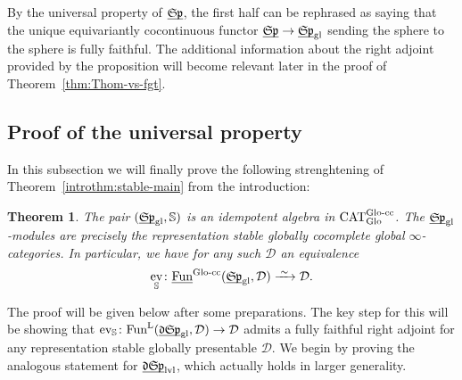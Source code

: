 \documentclass[reqno]{memo-l}
\theoremstyle{mythm}
\newtheorem{thm}{Theorem}[section]
\theoremstyle{definition}
\numberwithin{equation}{section}
\newcommand{\Dd}{{\mathcal{D}}}
\newcommand{\gl}{\textup{gl}}
\DeclareMathOperator{\ev}{ev}
\DeclareMathOperator{\CAT}{CAT}
\newcommand{\Fun}{{\textup{Fun}}}
\newcommand{\Glo}{\textup{Glo}}
\newcommand{\ulhelper}[2]{\underline{\setbox0=\hbox{$#1#2$}\dp0=0.4pt \box0\relax}}
\newcommand{\ul}[1]{{\mathpalette\ulhelper{#1}}\hbox{\rule[-2pt]{0pt}{0pt}}}
\newcommand{\iso}{\xrightarrow{\;\smash{\raisebox{-0.25ex}{\ensuremath{\scriptstyle\sim}}}\;}}
\newcommand{\mySp}{{\mathfrak S\kern-.5pt\mathfrak p}}
\newcommand{\myLSp}{{\mathfrak d\kern-.25pt}\mySp}
\newcommand{\ulmySplev}{\ul{\myLSp}_\textup{lvl}}
\begin{document}
By the universal property of $\ul\mySp$, the first half can be rephrased as saying that the unique equivariantly cocontinuous functor $\ul\mySp\to\ul\mySp_\gl$ sending the sphere to the sphere is fully faithful. The additional information about the right adjoint provided by the proposition will become relevant later in the proof of Theorem~\ref{thm:Thom-vs-fgt}.


\subsection{Proof of the universal property}\label{subsec:gl-sp-univ} In this subsection we will finally prove the following strenghtening of Theorem~\ref{introthm:stable-main} from the introduction:

\begin{thm}\label{thm:stable-main}
    The pair $(\ul\mySp_\gl,\mathbb S)$ is an idempotent algebra in $\CAT_{\Glo}^\textup{$\Glo$-cc}$. The $\ul\mySp_\gl$-modules are precisely the representation stable globally cocomplete global $\infty$-categories. In particular, we have for any such $\Dd$ an equivalence
    \[
        \ev_{\mathbb S}\colon\ul\Fun^\textup{$\Glo$-cc}(\ul\mySp_\gl,\Dd)\iso\Dd.
    \]
\end{thm}

The proof will be given below after some preparations. The key step for this will be showing that $\ev_{\mathbb S}\colon\Fun^\textup{L}(\ul\myLSp_\gl,\Dd)\to\Dd$ admits a fully faithful right adjoint for any representation stable globally presentable $\Dd$. We begin by proving the analogous statement for $\ulmySplev$, which actually holds in larger generality.
\end{document}
